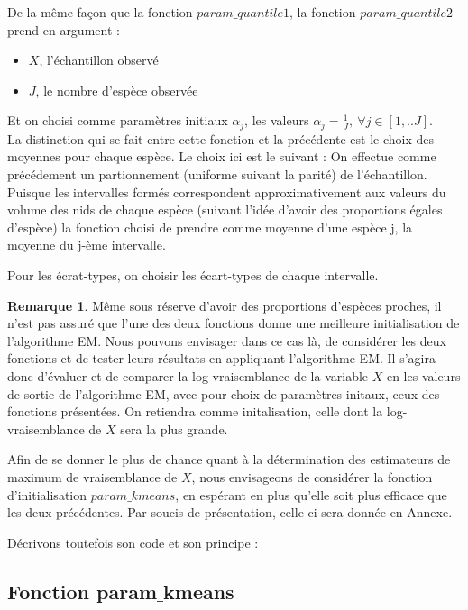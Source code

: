 \documentclass[frenchb]{report}
\newcommand{\1}{\mathbbm{1}}
\theoremstyle{definition}\newtheorem{defn}{Définition}
\theoremstyle{definition}\newtheorem{exm}{Exemple}
\theoremstyle{definition}\newtheorem{nota}{Notation}
\theoremstyle{definition}\newtheorem{rem}{Remarque}
\begin{document}
De la même façon que la fonction $param\_quantile1$, la fonction $param\_quantile2$ prend en argument : 
\begin{itemize}
	\item $X$, l'échantillon observé
	\item $J$, le nombre d'espèce observée
\end{itemize}

Et on choisi comme paramètres initiaux $\alpha_j$, les valeurs $\alpha_j = \frac{1}{J}, ~\forall j \in [1,..J]$.\\

La distinction qui se fait entre cette fonction et la précédente est le choix des moyennes pour chaque espèce. 
Le choix ici est le suivant : On effectue comme précédement un partionnement (uniforme suivant la parité) de l'échantillon. Puisque les intervalles formés correspondent approximativement aux valeurs du volume des nids de chaque espèce (suivant l'idée d'avoir des proportions égales d'espèce) la fonction choisi de prendre comme moyenne d'une espèce j, la moyenne du j-ème intervalle.

Pour les écrat-types, on choisir les écart-types de chaque intervalle.\\

\begin{rem}
Même sous réserve d'avoir des proportions d'espèces proches, il n'est pas assuré que l'une des deux fonctions donne une meilleure initialisation de l'algorithme EM.
Nous pouvons envisager dans ce cas là, de considérer les deux fonctions et de tester leurs résultats en appliquant l'algorithme EM. Il s'agira donc d'évaluer et de comparer la log-vraisemblance de la variable $X$ en les valeurs de sortie de l'algorithme EM, avec pour choix de paramètres initaux, ceux des fonctions présentées. On retiendra comme initalisation, celle dont la log-vraisemblance de $X$ sera la plus grande. \\
\end{rem}

Afin de se donner le plus de chance quant à la détermination des estimateurs de maximum de vraisemblance de $X$, nous envisageons de considérer la fonction d'initialisation $param\_kmeans$, en espérant en plus qu'elle soit plus efficace que les deux précédentes.
Par soucis de présentation, celle-ci sera donnée en Annexe.

Décrivons toutefois son code et son principe :

\subsection{Fonction param$\_$kmeans} 
\end{document}

